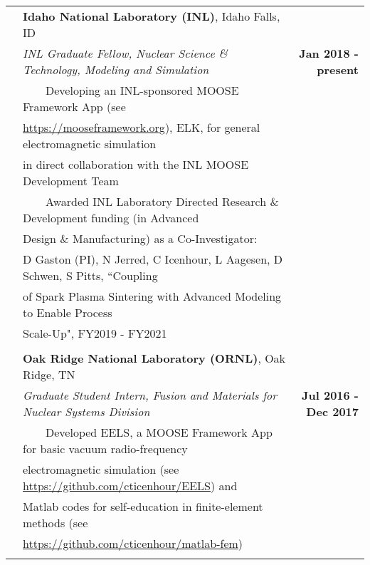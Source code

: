 \documentclass{article}
\newcommand{\tabitem}{~~\textbullet~~}
\begin{document}
\begin{tabularx}{\textwidth}{l X r}
	\hspace{2em} & \textbf{Idaho National Laboratory (INL)}, Idaho Falls, ID & \\
	& \textit{INL Graduate Fellow, Nuclear Science \& Technology, Modeling and Simulation} & \textbf{Jan 2018 - present} \\
	& \tabitem Developing an INL-sponsored MOOSE Framework App (see & \\
	& \hspace{1.5em} \url{https://mooseframework.org}), ELK, for general electromagnetic simulation  & \\
	& \hspace{1.5em} in direct collaboration with the INL MOOSE Development Team & \\
	& \tabitem Awarded INL Laboratory Directed Research \& Development funding (in Advanced & \\
	& \hspace{1.5em} Design \& Manufacturing) as a Co-Investigator: & \\
	& \hspace{2.5em} D Gaston (PI), N Jerred, C Icenhour, L Aagesen, D Schwen, S Pitts, ``Coupling & \\
	& \hspace{2.5em} of Spark Plasma Sintering with Advanced Modeling to Enable Process & \\
	& \hspace{2.5em} Scale-Up", FY2019 - FY2021 & \\
	& & \\
	& \textbf{Oak Ridge National Laboratory (ORNL)}, Oak Ridge, TN & \\
	& \textit{Graduate Student Intern, Fusion and Materials for Nuclear Systems Division} & \textbf{Jul 2016 - Dec 2017} \\
	& \tabitem Developed EELS, a MOOSE Framework App for basic vacuum radio-frequency & \\
	& \hspace{1.5em} electromagnetic simulation (see \url{https://github.com/cticenhour/EELS}) and & \\
	& \hspace{1.5em} Matlab codes for self-education in finite-element methods (see & \\
	& \hspace{1.5em} \url{https://github.com/cticenhour/matlab-fem})& \\
	& & \\

\end{tabularx}
\end{document}
